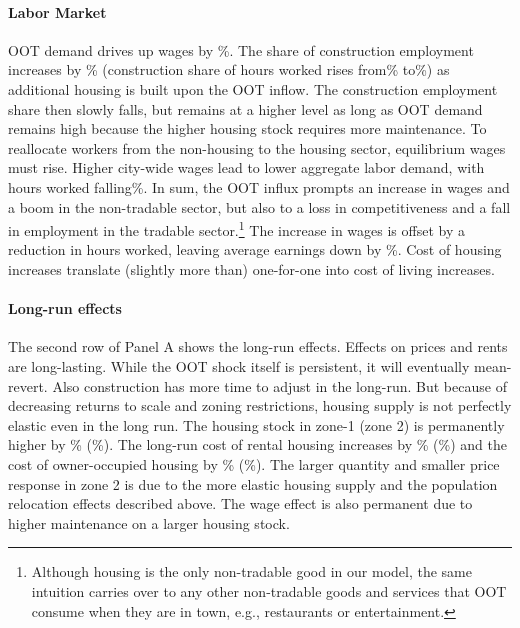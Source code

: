 \documentclass[letterpaper,12pt,dvipsnames,usenames]{article}
\theoremstyle{definition}
\begin{document}
\begin{spacing}{1.25}
\paragraph{Labor Market}
OOT demand drives up wages by {}\%. The share of construction employment increases by {\FracConstructChShort}\% (construction share of hours worked rises from{\FracConstructBefore}\% to{\FracConstructAfter}\%) as additional housing is built upon the OOT inflow. The construction employment share then slowly falls, but remains at a higher level as long as OOT demand remains high because the higher housing stock requires more maintenance. To reallocate workers from the non-housing to the housing sector, equilibrium wages must rise. Higher city-wide wages lead to lower aggregate labor demand, with hours worked falling{\HoursWorkedChange}\%.   In sum, the OOT influx prompts an increase in wages and a boom in the non-tradable sector, but also to a loss in competitiveness and a fall in employment in the tradable sector.\footnote{Although housing is the only non-tradable good in our model, the same intuition carries over to any other non-tradable goods and services that OOT consume when they are in town, e.g., restaurants or entertainment.} The increase in wages is offset by a reduction in hours worked, leaving average earnings down by \EarningsChange\%. Cost of housing increases translate (slightly more than) one-for-one into cost of living increases.


\paragraph{Long-run effects}
The second row of Panel A shows the long-run effects. Effects on prices and rents are long-lasting. While the OOT shock itself is persistent, it will eventually mean-revert. Also construction has more time to adjust in the long-run. But because of decreasing returns to scale and zoning restrictions, housing supply is not perfectly elastic even in the long run.  The housing stock in zone-1 (zone 2) is permanently higher by {}\% ({}\%). The long-run cost of rental housing increases by {}\% ({}\%) and the cost of owner-occupied housing by {}\% ({}\%). The larger quantity and smaller price response in zone 2 is due to the more elastic housing supply and the population relocation effects described above. The wage effect is also permanent due to higher maintenance on a larger housing stock.


\end{spacing}
\end{document}
